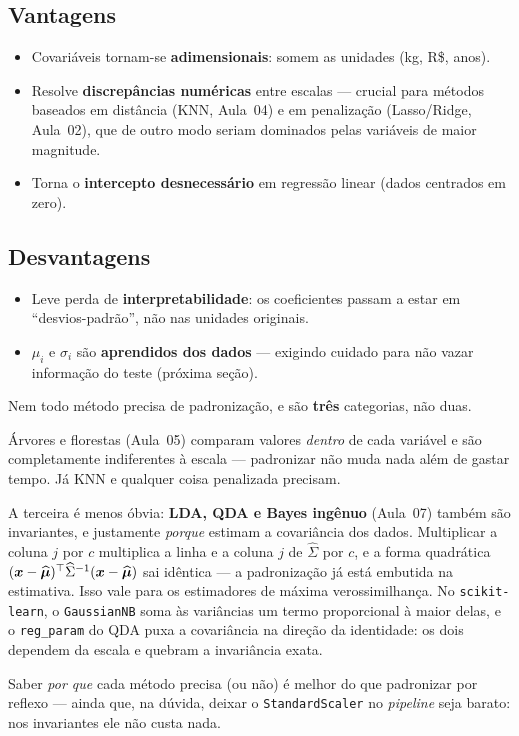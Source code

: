 \documentclass[11pt,a4paper]{article}
\begin{document}
\subsection{Vantagens}
\begin{itemize}[leftmargin=1.4cm,nosep]
  \item Covariáveis tornam-se \textbf{adimensionais}: somem as unidades (kg, R\$,
        anos).
  \item Resolve \textbf{discrepâncias numéricas} entre escalas --- crucial para
        métodos baseados em distância (KNN, Aula~04) e em penalização
        (Lasso/Ridge, Aula~02), que de outro modo seriam dominados pelas variáveis
        de maior magnitude.
  \item Torna o \textbf{intercepto desnecessário} em regressão linear (dados
        centrados em zero).
\end{itemize}

\subsection{Desvantagens}
\begin{itemize}[leftmargin=1.4cm,nosep]
  \item Leve perda de \textbf{interpretabilidade}: os coeficientes passam a estar
        em ``desvios-padrão'', não nas unidades originais.
  \item $\mu_i$ e $\sigma_i$ são \textbf{aprendidos dos dados} --- exigindo
        cuidado para não vazar informação do teste (próxima seção).
\end{itemize}

\begin{atencao}
Nem todo método precisa de padronização, e são \textbf{três} categorias, não duas.

Árvores e florestas (Aula~05) comparam valores \emph{dentro} de
cada variável e são completamente indiferentes à escala --- padronizar não muda
nada além de gastar tempo. Já KNN e qualquer coisa penalizada precisam.

A terceira é menos óbvia: \textbf{LDA, QDA e Bayes ingênuo} (Aula~07) também são
invariantes, e justamente \emph{porque} estimam a covariância dos dados.
Multiplicar a coluna $j$ por $c$ multiplica a linha e a coluna $j$ de
$\widehat\Sigma$ por $c$, e a forma quadrática
$(\bm{x}-\widehat{\bm\mu})^\top\widehat\Sigma^{-1}(\bm{x}-\widehat{\bm\mu})$ sai idêntica
--- a padronização já está embutida na estimativa. Isso vale para os estimadores
de máxima verossimilhança. No \texttt{scikit-learn}, o \texttt{GaussianNB} soma às
variâncias um termo proporcional à maior delas, e o \texttt{reg\_param} do QDA puxa
a covariância na direção da identidade: os dois dependem da escala e quebram a
invariância exata.

Saber \emph{por que} cada método precisa (ou não) é melhor do que padronizar por
reflexo --- ainda que, na dúvida, deixar o \texttt{StandardScaler} no
\emph{pipeline} seja barato: nos invariantes ele não custa nada.
\end{atencao}
\end{document}
